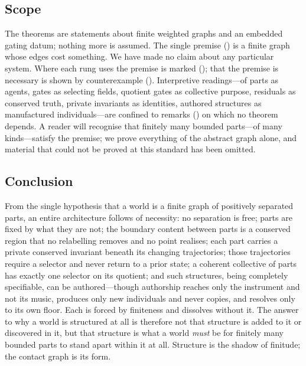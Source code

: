 \documentclass[11pt,a4paper]{article}
\theoremstyle{thmstyle}
\theoremstyle{definition}
\theoremstyle{remark}
\begin{document}
\subsection{Scope}

The theorems are statements about finite weighted graphs and an embedded gating
datum; nothing more is assumed. The single premise () is a finite
graph whose edges cost something. We have made no claim about any particular
system. Where each rung uses the premise is marked (); that
the premise is necessary is shown by counterexample ().
Interpretive readings---of parts as agents, gates as selecting fields, quotient
gates as collective purpose, residuals as conserved truth, private invariants as
identities, authored structures as manufactured individuals---are confined to
remarks () on which no theorem depends. A reader
will recognise that finitely many bounded parts---of many kinds---satisfy the
premise; we prove everything of the abstract graph alone, and material that could
not be proved at this standard has been omitted.

\subsection{Conclusion}

From the single hypothesis that a world is a finite graph of positively separated
parts, an entire architecture follows of necessity: no separation is free; parts
are fixed by what they are not; the boundary content between parts is a conserved
region that no relabelling removes and no point realises; each part carries a
private conserved invariant beneath its changing trajectories; those trajectories
require a selector and never return to a prior state; a coherent collective of
parts has exactly one selector on its quotient; and such structures, being
completely specifiable, can be authored---though authorship reaches only the
instrument and not its music, produces only new individuals and never copies, and
resolves only to its own floor. Each is forced by finiteness and dissolves
without it. The answer to why a world is structured at all is therefore not that
structure is added to it or discovered in it, but that structure is what a world
\emph{must} be for finitely many bounded parts to stand apart within it at all.
Structure is the shadow of finitude; the contact graph is its form.



\end{document}
